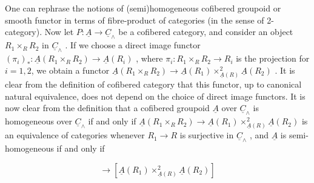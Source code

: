 \begin{center}
\end{center}
One can rephrase the notions of (semi)homogeneous cofibered groupoid or smooth functor in terms of fibre-product of categories (in the sense of 2-category). Now let  $P : \underline{A} \to \underline{C}_\wedge$  be a cofibered category, and consider an object $R_1 \times_R R_2$  in  $\underline{C}_\wedge$ . If we choose a direct image functor  $(\pi_i)_*: \underline{A}(R_1 \times_R R_2) \to \underline{A}(R_i)$ , where  $\pi_i : R_1 \times_R R_2 \to R_i$  is the projection for  $i = 1,2$,  we obtain a functor $\underline{A}(R_1 \times_R R_2) \to \underline{A}(R_1) \times^2_{\underline{A}(R)} \underline{A}(R_2)$ . It is clear from the definition of cofibered category that this functor, up to canonical natural equivalence, does not depend on the choice of direct image functors. It is now clear from the definition that a cofibered groupoid  $\underline{A}$  over  $\underline{C}_\wedge$  is homogeneous over  $\underline{C}_\wedge$  if and only if $\underline{A}(R_1 \times_R R_2) \to \underline{A}(R_1) \times^2_{\underline{A}(R)} \underline{A}(R_2)$  is an equivalence of categories whenever  $R_1 \to R$  is surjective in  $\underline{C}_\wedge$ , and  $\underline{A}$  is semi-homogeneous if and only if

\begin{equation*}
[\underline{A}(R \times_R R_2)] \longrightarrow [\underline{A}(R_1) \times^2_{\underline{A}(R)} \underline{A}(R_2)] 
\end{equation*}

